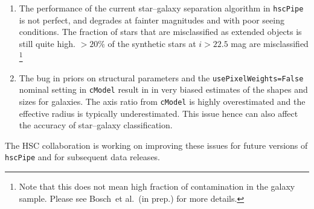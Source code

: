 \documentclass[useamsfonts]{pasj01}
\def\etal{{\ et al.~}}
\def\hscpipe{\texttt{hscPipe}}
\def\cmodel{\texttt{cModel}}
\begin{document}
    \begin{enumerate}

        \item The performance of the current star--galaxy separation algorithm in 
            \hscpipe{} is not perfect, and degrades at fainter magnitudes and with 
            poor seeing conditions.
            The fraction of stars that are misclassified as extended objects is still
            quite high. 
            $>20$\% of the synthetic stars at $i> 22.5$ mag are misclassified
            \footnote{Note that this does not mean high fraction of contamination 
            in the galaxy sample. Please see Bosch\etal (in prep.) for more 
            details.}

        \item The bug in priors on structural parameters and the 
            \texttt{usePixelWeights=False} nominal setting in \cmodel{} result in         
            in very biased estimates of the shapes and sizes for galaxies. 
            The axis ratio from \cmodel{} is highly overestimated and the effective 
            radius is typically underestimated.  
            This issue hence can also affect the accuracy of star--galaxy 
            classification.

    \end{enumerate}

    The HSC collaboration is working on improving these issues for future versions
    of \hscpipe{} and for subsequent data releases.  
    
\end{document}
